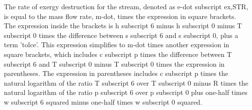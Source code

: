 The rate of exergy destruction for the stream, denoted as e-dot subscript ex,STR, is equal to the mass flow rate, m-dot, times the expression in square brackets. The expression inside the brackets is h subscript 6 minus h subscript 0 minus T subscript 0 times the difference between s subscript 6 and s subscript 0, plus a term 'tolce'. This expression simplifies to m-dot times another expression in square brackets, which includes c subscript p times the difference between T subscript 6 and T subscript 0 minus T subscript 0 times the expression in parentheses. The expression in parentheses includes c subscript p times the natural logarithm of the ratio T subscript 6 over T subscript 0 minus R times the natural logarithm of the ratio p subscript 6 over p subscript 0 plus one-half times w subscript 6 squared minus one-half times w subscript 0 squared.